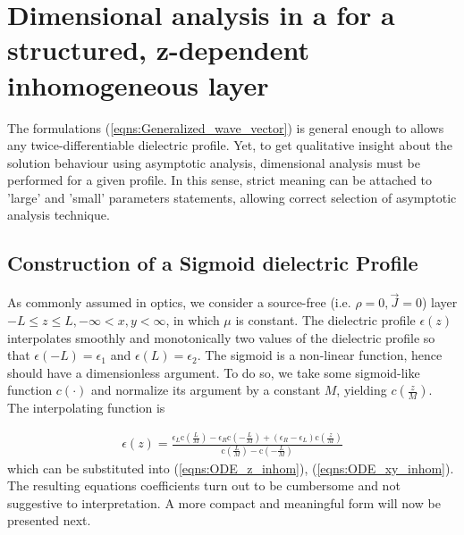 \documentclass[twocolumn,secnumarabic,amssymb, nobibnotes, aps, prd]{revtex4-1}
\begin{document}
   
  


\section{Dimensional analysis in a for a structured, z-dependent inhomogeneous layer} 
The formulations (\ref{eqns:Generalized_wave_vector}) is general enough to allows any twice-differentiable dielectric profile. Yet,  to get qualitative insight about the solution behaviour using asymptotic analysis, dimensional analysis must be performed for a given profile. In this sense, strict meaning can be attached to 'large' and 'small' parameters statements, allowing correct selection of asymptotic analysis technique.  
\subsection{Construction of a Sigmoid dielectric Profile}
\label{sec:sigmoid_profile}
As commonly assumed in optics, we consider a source-free (i.e. $\rho=0, \overrightarrow{J}=0$) layer $-L \leq z \leq L, -\infty < x,y < \infty$, in  which $\mu$ is constant. The dielectric profile $\epsilon(z)$ interpolates smoothly and monotonically two values of the dielectric profile so that $\epsilon(-L)=\epsilon_1$ and $\epsilon(L)=\epsilon_2$. The sigmoid is a non-linear function, hence should have a dimensionless argument. To do so, we take some sigmoid-like function $c( \cdot )$ and normalize its argument  by  a constant $M$, yielding $c\left( \frac{z}{M}\right)$. The interpolating function is


\begin{align}
\epsilon(z) = \frac{\epsilon_L \text{c}\left(\frac{L}{M}\right)-\epsilon_R \text{c}\left(-\frac{L}{M}\right)+(\epsilon_R-\epsilon_L)
   \text{c}\left(\frac{z}{M}\right)}{\text{c}\left(\frac{L}{M}\right)-\text{c}\left(-\frac{L}{M}\right)
   }
\label{eqns:eps_z_dim_profile}
\end{align}
which can be substituted into (\ref{eqns:ODE_z_inhom}), (\ref{eqns:ODE_xy_inhom}). The resulting equations coefficients turn out to be cumbersome and not suggestive to interpretation. A more compact and meaningful form will now be presented next.

  
\end{document}
